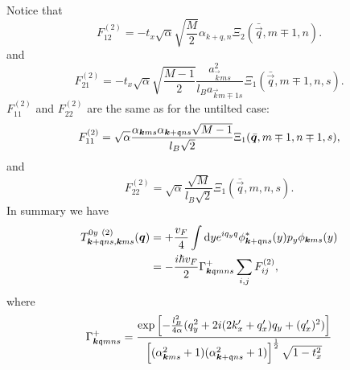 Notice that
\begin{equation}
  F^{(2)}_{12}
  = -t_x \sqrt{\alpha}  \sqrt{\frac{M}{2}} \alpha _{k+q, n} \Xi_2(\bar{\vec{q}}, m\mp 1, n).
\end{equation}
and
\begin{equation}
  \label{eq:55}
  F^{(2)}_{21}
  =
  -t_{x} \sqrt{\alpha} \sqrt{\frac{M-1}{2}} \frac{a_{\vec{k} m s}^2}{l_B a_{\vec{k} m \mp 1 s}}
  \Xi_{1} (\bar{\vec{q}}, m \mp 1, n, s).
\end{equation}
\( F^{(2)}_{11} \) and \( F^{(2)}_{22} \) are the same as for the untilted case:
\begin{equation}
  \label{eq:56}
  F^{(2)}_{11} = \sqrt{\alpha}  \frac{\alpha_{\bm{k} m s} \alpha_{\bm{k} + \mathfrak{q} ns} \sqrt{M-1} }{ l_B \sqrt{2} }
  \Xi_{1} (\bar{\bm{q}}, m\mp 1, n\mp 1, s),
\end{equation}
and
\begin{equation}
  \label{eq:57}
  F^{(2)}_{22} =
  \sqrt{\alpha }
  \frac{\sqrt{M} }{l_B \sqrt{2} }
  \Xi_{1} ( \bar{\vec{q}}, m, n, s ).
\end{equation}
In summary we have
\begin{align}
  \label{eq:58}
  T^{0y~(2)}_{\bm{k} + \mathfrak{q} ns, \bm{k} ms} (\bm{q}) &= + \frac{v_F}{4} \int \mathrm{d} y
  e^{i q_y q} \phi _{\bm{k} + \mathfrak{q} ns}^{*} (y) p_{y} \phi _{\bm{k} ms} (y)\\
&= -\frac{ i \hbar v_{F} }{2}
                                                                                     \Gamma _{\bm{k} \mathfrak{q} m n s}^+
\sum\limits_{i,j}^{} F^{(2)}_{ij},
\end{align}
where
\[
  \Gamma _{\bm{k} \mathfrak{q} m n s}^+ =
  \frac{
  \exp
  \left[
    - \frac{l_{B}^2}{4 \alpha } (q_{y}^2 + 2 i (2k' _x + q' _x) q_{y} + (q' _x)^2 )
  \right  ]
}{
  \left[(\alpha_{\bm{k} m s}^2 +1) (\alpha_{\bm{k} + \mathfrak{q} ns} ^2 + 1)\right]^{\frac{1}{2}}
  \sqrt{1 - t_x^2 }}
\]

